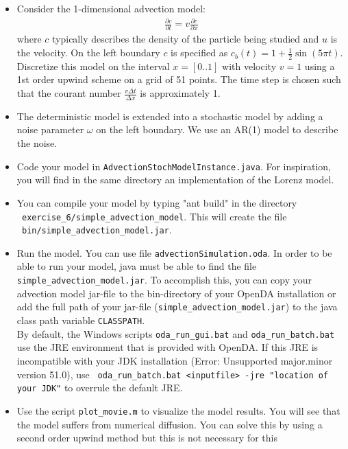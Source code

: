 \begin{itemize}
\item Consider the 1-dimensional advection model:
   \begin{eqnarray}
      \frac{\partial c}{\partial t}=v \frac{\partial c}{\partial x}
   \end{eqnarray}
   where $c$ typically describes the density of the particle being studied and
   $u$ is the velocity. On the left boundary $c$ is specified as
   $c_b(t)=1+\frac{1}{2}\sin(5 \pi t)$. Discretize this model on the interval
   $x=[0..1]$ with velocity $v=1$ using a 1st order upwind scheme on a grid of
   51 points. The time step is chosen such that the courant number $\frac{v
     \Delta t}{\Delta x}$ is approximately 1.
\item The deterministic model is extended into a stochastic model by adding a
  noise parameter $\omega$ on the left boundary. We use an AR(1) model to
  describe the noise.
\item Code your model in {\tt AdvectionStochModelInstance.java}. For
  inspiration, you will find in the same directory an implementation of the
  Lorenz model.
\item You can compile your model by typing "ant build" in the directory \\ {\tt
  exercise\_6/simple\_advection\_model}. This will create the file \\ {\tt
  bin/simple\_advection\_model.jar}.
\item Run the model. You can use file {\tt advectionSimulation.oda}. In order
  to be able to run your model, java must be able to find the file {\tt
    simple\_advection\_model.jar}. To accomplish this, you can copy your
  advection model jar-file to the bin-directory of your OpenDA installation or
  add the full path of your jar-file ({\tt simple\_advection\_model.jar}) to
  the java class path variable {\tt CLASSPATH}.\\ By default, the Windows
  scripts {\tt oda\_run\_gui.bat} and {\tt oda\_run\_batch.bat} use the JRE
  environment that is provided with OpenDA. If this JRE is incompatible with
  your JDK installation (Error: Unsupported major.minor version 51.0), use {\tt
    oda\_run\_batch.bat <inputfile> -jre "location of your JDK"} to overrule
  the default JRE.
\item Use the script {\tt plot\_movie.m} to visualize the model results. You
  will see that the model suffers from numerical diffusion. You can solve this
  by using a second order upwind method but this is not necessary for this

\end{itemize}
